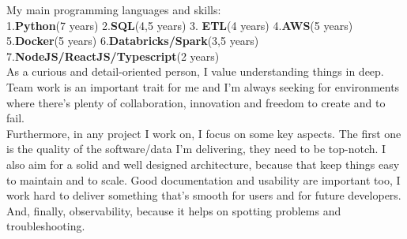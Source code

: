 \documentclass[9pt]{developercv} %
\begin{document}
\vspace{0.5cm}




My main programming languages and skills:\\
1.\textbf{Python}(7 years)   2.\textbf{SQL}(4,5 years) 3. \textbf{ETL}(4 years) 4.\textbf{AWS}(5 years) 5.\textbf{Docker}(5 years) 6.\textbf{Databricks/Spark}(3,5 years) \\7.\textbf{NodeJS/ReactJS/Typescript}(2 years)\\

As a curious and detail-oriented person, I value understanding things in deep. Team work is an important trait for me and I'm always seeking for environments where there's plenty of collaboration, innovation and freedom to create and to fail.\\

Furthermore, in any project I work on, I focus on some key aspects. The first one is the quality of the software/data I'm delivering, they need to be top-notch. I also aim for a solid and well designed architecture, because that keep things easy to maintain and to scale. Good documentation and usability are important too, I work hard to deliver something that's smooth for users and for future developers. And, finally, observability, because it helps on spotting problems and troubleshooting.



\end{document}
